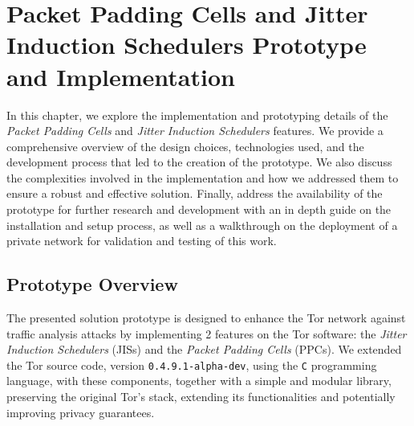 
%

\chapter{Packet Padding Cells and Jitter Induction Schedulers Prototype and Implementation}\label{cha:implementation}

In this chapter, we explore the implementation and prototyping details of the \textit{Packet Padding Cells} and \textit{Jitter Induction Schedulers} features. We provide a comprehensive overview of the design choices, technologies used, and the development process that led to the creation of the prototype. We also discuss the complexities involved in the implementation and how we addressed them to ensure a robust and effective solution.
Finally, address the availability of the prototype for further research and development with an in depth guide on the installation and setup process, as well as a walkthrough on the deployment of a private network for validation and testing of this work.

\section{Prototype Overview}\label{sec:prototype_overview}

The presented solution prototype is designed to enhance the Tor network against traffic analysis attacks by implementing 2 features on the Tor software: the \textit{Jitter Induction Schedulers} (JISs) and the \textit{Packet Padding Cells} (PPCs). We extended the Tor source code, version \texttt{0.4.9.1-alpha-dev}, using the \texttt{C} programming language, with  these components, together with a simple and modular library, preserving the original Tor's stack, extending its functionalities and potentially improving privacy guarantees.

